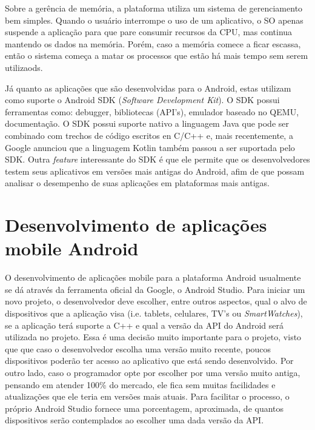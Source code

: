 \documentclass[
    12pt,       %
    openright,      %
    twoside,      %
    a4paper,      %
    english,      %
    french,       %
    spanish,      %
    brazil,       %
    ]{abntex2}
\begin{document}
        Sobre a gerência de memória, a plataforma utiliza um sistema de gerenciamento bem simples.
        Quando o usuário interrompe o uso de um aplicativo, o SO apenas suspende a aplicação para
        que pare consumir recursos da CPU, mas continua mantendo os dados na memória. Porém, caso
        a memória comece a ficar escassa, então o sistema começa a matar os processos que estão
        há mais tempo sem serem utilizaods.

        Já quanto as aplicações que são desenvolvidas para o Android, estas utilizam como suporte
        o Android SDK (\textit{Software Development Kit}). O SDK possui ferramentas como: debugger,
        bibliotecas (API's), emulador baseado no QEMU, documentação. O SDK possui suporte nativo
        a linguagem Java que pode ser combinado com trechos de código escritos en C/C++ e,
        mais recentemente, a Google anunciou que a linguagem Kotlin também passou a ser suportada
        pelo SDK. Outra \textit{feature} interessante do SDK é que ele permite que os
        desenvolvedores testem seus aplicativos em versões mais antigas do Android, afim de
        que possam analisar o desempenho de suas aplicações em plataformas mais antigas.

      \section{Desenvolvimento de aplicações mobile Android}
        O desenvolvimento de aplicações mobile para a plataforma Android usualmente se dá através
        da ferramenta oficial da Google, o Android Studio. Para iniciar um novo projeto, o
        desenvolvedor deve escolher, entre outros aspectos, qual o alvo de dispositivos que a
        aplicação visa (i.e. tablets, celulares, TV's ou \textit{SmartWatches}), se a aplicação
        terá suporte a C++ e qual a versão da API do Android será utilizada no projeto. Essa é
        uma decisão muito importante para o projeto, visto que que caso o desenvolvedor escolha
        uma versão muito recente, poucos dispositivos poderão ter acesso ao aplicativo que está
        sendo desenvolvido. Por outro lado, caso o programador opte por escolher por uma versão
        muito antiga, pensando em atender 100\% do mercado, ele fica sem muitas facilidades e
        atualizações que ele teria em versões mais atuais. Para facilitar o processo, o próprio
        Android Studio fornece uma porcentagem, aproximada, de quantos dispositivos serão contemplados
        ao escolher uma dada versão da API.
\end{document}
